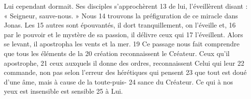 Lui cependant dormait. Ses disciples s'approchèrent	 
13	 	de lui, l'éveillèrent disant : « Seigneur, sauve-nous. » Nous	 
14	 	trouvons la préfiguration de ce miracle dans Jonas. Les	 
15	 	autres sont épouvantés, il dort tranquillement, on l'éveille et,	 
16	 	par le pouvoir et le mystère de sa passion, il délivre ceux qui	 
17	 	l'éveillent.
Alors se levant, il apostropha les vents et la mer.	 
19	 	Ce passage nous fait comprendre que tous les éléments de la	 
20	 	création reconnaissent le Créateur. Ceux qu'il apostrophe,	 
21	 	ceux auxquels il donne des ordres, reconnaissent Celui qui leur	 
22	 	commande, non pas selon l'erreur des hérétiques qui pensent	 
23	 	que tout est doué d'une âme, mais à cause de la toute-puis-	 
24	 	sance du Créateur. Ce qui à nos yeux est insensible est sensible	 
25	 	à Lui.